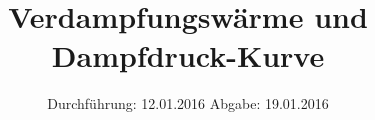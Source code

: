 

\subject{VERSUCH NUMMER V203}
\title{Verdampfungswärme und Dampfdruck-Kurve}
\date{
  Durchführung: 12.01.2016
  \hspace{3em}
  Abgabe: 19.01.2016
}



\maketitle
\thispagestyle{empty}
\tableofcontents
\newpage







\printbibliography


